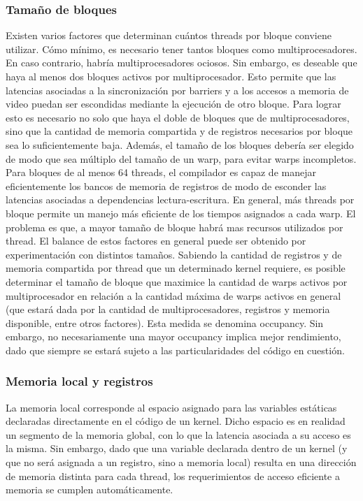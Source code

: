 \documentclass[a4paper,10pt]{report}
\begin{document}
\subsubsection{Tamaño de bloques}
Existen varios factores que determinan cuántos threads por bloque conviene utilizar. Cómo mínimo,
es necesario tener tantos bloques como multiprocesadores. En caso contrario, habría multiprocesadores
ociosos. Sin embargo, es deseable que haya al menos dos bloques activos por multiprocesador. Esto
permite que las latencias asociadas a la sincronización por barriers y a los accesos a memoria de video
puedan ser escondidas mediante la ejecución de otro bloque. Para lograr esto es necesario no solo que
haya el doble de bloques que de multiprocesadores, sino que la cantidad de memoria compartida y de
registros necesarios por bloque sea lo suficientemente baja.
Además, el tamaño de los bloques debería ser elegido de modo que sea múltiplo del tamaño de un
warp, para evitar warps incompletos. Para bloques de al menos 64 threads, el compilador es capaz de manejar eficientemente los bancos de memoria de registros de modo de esconder las latencias asociadas a
dependencias lectura-escritura. En general, más threads por bloque permite un manejo más eficiente de
los tiempos asignados a cada warp. El problema es que, a mayor tamaño de bloque habrá mas recursos
utilizados por thread. El balance de estos factores en general puede ser obtenido por experimentación
con distintos tamaños.
Sabiendo la cantidad de registros y de memoria compartida por thread que un determinado kernel
requiere, es posible determinar el tamaño de bloque que maximice la cantidad de warps activos por
multiprocesador en relación a la cantidad máxima de warps activos en general (que estará dada por la
cantidad de multiprocesadores, registros y memoria disponible, entre otros factores). Esta medida se
denomina occupancy. Sin embargo, no necesariamente una mayor occupancy implica mejor rendimiento,
dado que siempre se estará sujeto a las particularidades del código en cuestión.


\subsubsection{Memoria local y registros}

La memoria local corresponde al espacio asignado para las variables estáticas declaradas directamente en el código de un kernel. Dicho espacio es en realidad un segmento de la memoria global, con
lo que la latencia asociada a su acceso es la misma. Sin embargo, dado que una variable declarada dentro de un kernel (y que no será asignada a un registro, sino a memoria local) resulta en una dirección
de memoria distinta para cada thread, los requerimientos de acceso eficiente a memoria se cumplen
automáticamente.
\end{document}
